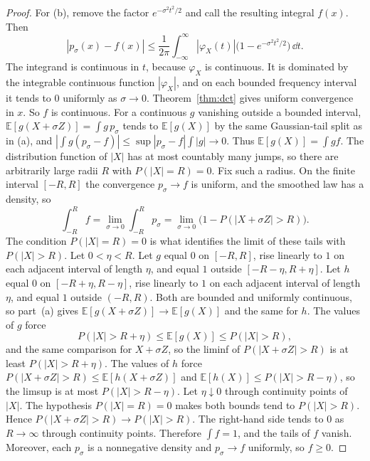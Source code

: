 \begin{proof}
For (b), remove the factor $e^{-\sigma^2 t^2/2}$ and call the resulting integral $f(x)$. Then
\[
 |p_\sigma(x)-f(x)|\le\frac1{2\pi}\int_{-\infty}^{\infty}|\varphi_X(t)|\bigl(1-e^{-\sigma^2 t^2/2}\bigr)\,\dd t.
\]
The integrand is continuous in $t$, because $\varphi_X$ is continuous. It is dominated by the integrable continuous function $|\varphi_X|$, and on each bounded frequency interval it tends to $0$ uniformly as $\sigma\to0$. Theorem~\ref{thm:dct} gives uniform convergence in $x$. So $f$ is continuous. For a continuous $g$ vanishing outside a bounded interval, $\mathbb E[g(X+\sigma Z)]=\int g\,p_\sigma$ tends to $\mathbb E[g(X)]$ by the same Gaussian-tail split as in (a), and $|\int g(p_\sigma-f)|\le\sup|p_\sigma-f|\int|g|\to0$. Thus $\mathbb E[g(X)]=\int g f$. The distribution function of $|X|$ has at most countably many jumps, so there are arbitrarily large radii $R$ with $P(|X|=R)=0$. Fix such a radius. On the finite interval $[-R,R]$ the convergence $p_\sigma\to f$ is uniform, and the smoothed law has a density, so
\[
 \int_{-R}^{R}f=\lim_{\sigma\to0}\int_{-R}^{R}p_\sigma=\lim_{\sigma\to0}\bigl(1-P(|X+\sigma Z|>R)\bigr).
\]
The condition $P(|X|=R)=0$ is what identifies the limit of these tails with $P(|X|>R)$. Let $0<\eta<R$. Let $g$ equal $0$ on $[-R,R]$, rise linearly to $1$ on each adjacent interval of length $\eta$, and equal $1$ outside $[-R-\eta,R+\eta]$. Let $h$ equal $0$ on $[-R+\eta,R-\eta]$, rise linearly to $1$ on each adjacent interval of length $\eta$, and equal $1$ outside $(-R,R)$. Both are bounded and uniformly continuous, so part~(a) gives $\mathbb E[g(X+\sigma Z)]\to\mathbb E[g(X)]$ and the same for $h$. The values of $g$ force
\[
 P(|X|>R+\eta)\le\mathbb E[g(X)]\le P(|X|>R),
\]
and the same comparison for $X+\sigma Z$, so the liminf of $P(|X+\sigma Z|>R)$ is at least $P(|X|>R+\eta)$. The values of $h$ force $P(|X+\sigma Z|>R)\le\mathbb E[h(X+\sigma Z)]$ and $\mathbb E[h(X)]\le P(|X|>R-\eta)$, so the limsup is at most $P(|X|>R-\eta)$. Let $\eta\downarrow0$ through continuity points of $|X|$. The hypothesis $P(|X|=R)=0$ makes both bounds tend to $P(|X|>R)$. Hence $P(|X+\sigma Z|>R)\to P(|X|>R)$. The right-hand side tends to $0$ as $R\to\infty$ through continuity points. Therefore $\int f=1$, and the tails of $f$ vanish. Moreover, each $p_\sigma$ is a nonnegative density and $p_\sigma\to f$ uniformly, so $f\ge0$.


\end{proof}

